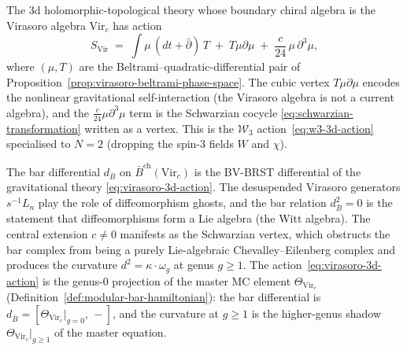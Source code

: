 \begin{proposition}
\label{prop:virasoro-3d-gravity-action}
The 3d holomorphic-topological theory whose boundary chiral algebra
is the Virasoro algebra $\mathrm{Vir}_c$ has action
\begin{equation}\label{eq:virasoro-3d-action}
  S_{\mathrm{Vir}}
  \;=\;
  \int \mu\,(dt + \bar\partial)\,T
  \;+\;
  T\mu\partial\mu
  \;+\;
  \frac{c}{24}\,\mu\,\partial^3\mu,
\end{equation}
where $(\mu, T)$ are the Beltrami--quadratic-differential pair of
Proposition~\ref{prop:virasoro-beltrami-phase-space}.  The cubic
vertex $T\mu\partial\mu$ encodes the nonlinear gravitational
self-interaction (the Virasoro algebra is not a current algebra), and
the $\frac{c}{24}\mu\partial^3\mu$ term is the Schwarzian cocycle
\eqref{eq:schwarzian-transformation} written as a vertex.  This is
the $\mathcal{W}_3$ action~\eqref{eq:w3-3d-action} specialised to
$N = 2$ (dropping the spin-$3$ fields $W$ and $\chi$).
\end{proposition}

\begin{remark}
\label{rem:virasoro-bar-brst-gravity}
The bar differential $d_{\bar{B}}$ on
$\bar{B}^{\mathrm{ch}}(\mathrm{Vir}_c)$ is the BV-BRST differential
of the gravitational theory \eqref{eq:virasoro-3d-action}.  The
desuspended Virasoro generators $s^{-1}L_n$ play the role of
diffeomorphism ghosts, and the bar relation $d_{\bar{B}}^2 = 0$
is the statement that diffeomorphisms form a Lie algebra (the Witt
algebra).  The central extension $c \neq 0$ manifests as the
Schwarzian vertex, which obstructs the bar complex from being a
purely Lie-algebraic Chevalley--Eilenberg complex and produces the
curvature $d^2 = \kappa \cdot \omega_g$ at genus $g \geq 1$.
The
action~\eqref{eq:virasoro-3d-action} is the genus-$0$ projection
of the master MC element $\Theta_{\mathrm{Vir}_c}$
(Definition~\ref{def:modular-bar-hamiltonian}): the bar differential
is $d_{\bar{B}} = [\Theta_{\mathrm{Vir}_c}\big|_{g=0},\, -]$, and
the curvature at $g \geq 1$ is the higher-genus shadow
$\Theta_{\mathrm{Vir}_c}\big|_{g \geq 1}$ of the master equation.
\end{remark}

